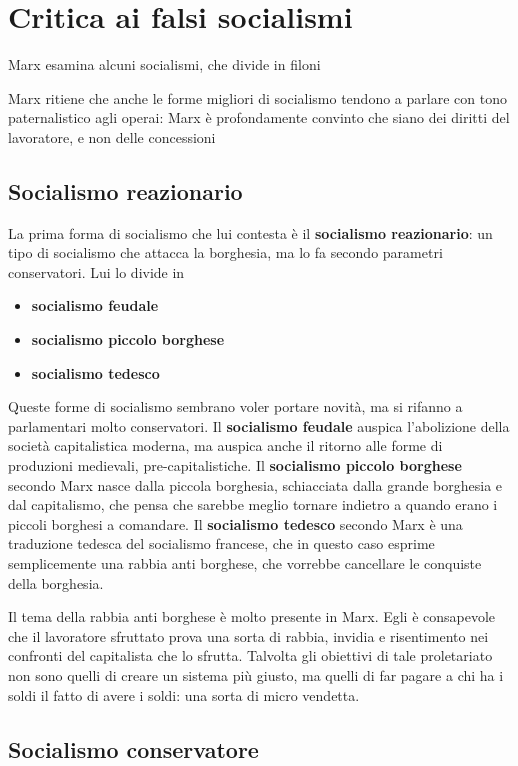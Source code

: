 \documentclass[a4paper, twoside, titlepage]{book}
\begin{document}
\chapter{Critica ai falsi socialismi}

Marx esamina alcuni socialismi, che divide in filoni

Marx ritiene che anche le forme migliori di socialismo tendono a parlare con tono paternalistico agli operai: Marx è profondamente convinto che siano dei diritti del lavoratore, e non delle concessioni

\section{Socialismo reazionario}

La prima forma di socialismo che lui contesta è il \textbf{socialismo reazionario}: un tipo di socialismo che attacca la borghesia, ma lo fa secondo parametri conservatori. Lui lo divide in
\begin{itemize}
\item \textbf{socialismo feudale}
\item \textbf{socialismo piccolo borghese}
\item \textbf{socialismo tedesco}
\end{itemize}

Queste forme di socialismo sembrano voler portare novità, ma si rifanno a parlamentari molto conservatori.
Il \textbf{socialismo feudale} auspica l’abolizione della società capitalistica moderna, ma auspica anche il ritorno alle forme di produzioni medievali, pre-capitalistiche.
Il \textbf{socialismo piccolo borghese} secondo Marx nasce dalla piccola borghesia, schiacciata dalla grande borghesia e dal capitalismo, che pensa che sarebbe meglio tornare indietro a quando erano i piccoli borghesi a comandare.
Il \textbf{socialismo tedesco} secondo Marx è una traduzione tedesca del socialismo francese, che in questo caso esprime semplicemente una rabbia anti borghese, che vorrebbe cancellare le conquiste della borghesia.

Il tema della rabbia anti borghese è molto presente in Marx. Egli è consapevole che il lavoratore sfruttato prova una sorta di rabbia, invidia e risentimento nei confronti del capitalista che lo sfrutta.
Talvolta gli obiettivi di tale proletariato non sono quelli di creare un sistema più giusto, ma quelli di far pagare a chi ha i soldi il fatto di avere i soldi: una sorta di micro vendetta.

\section{Socialismo conservatore}
\end{document}
